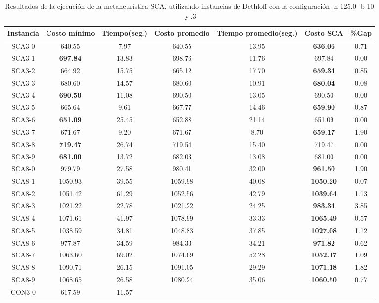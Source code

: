 \begin{table}[ht]
\caption{Resultados de la ejecución de la metaheurística SCA, utilizando instancias de Dethloff con la configuración -n 125.0 -b 10 -y .3}
\centering
\small
\begin{tabular}{c c c c c c c}
\hline\hline
Instancia & Costo mínimo & Tiempo(seg.) & Costo promedio & Tiempo promedio(seg.) & Costo SCA & \%Gap \\ [0.5ex]
\hline
SCA3-0 & 640.55 & 7.97 & 
640.55 & 13.95 & \bf{636.06} & 
0.71\\SCA3-1 & \bf{697.84} & 13.83 & 
698.76 & 11.76 & 697.84 & 0.00\\
SCA3-2 & 664.92 & 15.75 & 
665.12 & 17.70 & \bf{659.34} & 
0.85\\SCA3-3 & 680.60 & 14.57 & 
680.60 & 10.91 & \bf{680.04} & 
0.08\\SCA3-4 & \bf{690.50} & 11.08 & 
690.50 & 13.05 & 690.50 & 0.00\\
SCA3-5 & 665.64 & 9.61 & 
667.77 & 14.46 & \bf{659.90} & 
0.87\\SCA3-6 & \bf{651.09} & 25.45 & 
652.88 & 21.14 & 651.09 & 0.00\\
SCA3-7 & 671.67 & 9.20 & 
671.67 & 8.70 & \bf{659.17} & 
1.90\\SCA3-8 & \bf{719.47} & 26.74 & 
719.54 & 15.40 & 719.47 & 0.00\\
SCA3-9 & \bf{681.00} & 13.72 & 
682.03 & 13.08 & 681.00 & 0.00\\
SCA8-0 & 979.79 & 27.58 & 
980.41 & 32.00 & \bf{961.50} & 
1.90\\SCA8-1 & 1050.93 & 39.55 & 
1059.98 & 40.08 & \bf{1050.20} & 
0.07\\SCA8-2 & 1051.42 & 61.29 & 
1052.56 & 42.79 & \bf{1039.64} & 
1.13\\SCA8-3 & 1021.22 & 22.78 & 
1021.22 & 24.25 & \bf{983.34} & 
3.85\\SCA8-4 & 1071.61 & 41.97 & 
1078.99 & 33.33 & \bf{1065.49} & 
0.57\\SCA8-5 & 1038.59 & 34.81 & 
1048.83 & 37.85 & \bf{1027.08} & 
1.12\\SCA8-6 & 977.87 & 34.59 & 
984.33 & 34.21 & \bf{971.82} & 
0.62\\SCA8-7 & 1063.60 & 69.02 & 
1074.69 & 52.28 & \bf{1052.17} & 
1.09\\SCA8-8 & 1090.71 & 26.15 & 
1091.05 & 29.29 & \bf{1071.18} & 
1.82\\SCA8-9 & 1068.65 & 26.58 & 
1080.24 & 35.06 & \bf{1060.50} & 
0.77\\CON3-0 & 617.59 & 11.57 & 

\end{tabular}
\end{table}
